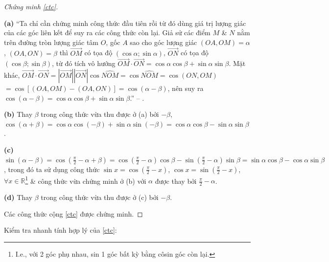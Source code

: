 \documentclass[oneside]{book}
\numberwithin{equation}{section}
\begin{document}
\begin{proof}[Chứng minh \eqref{ctc}]
	\begin{enumerate*}
		\item[\textbf{(a)}] ``Ta chỉ cần chứng minh công thức đầu tiên rồi từ đó dùng giá trị lượng giác của các góc liên kết để suy ra các công thức còn lại. Giả sử các điểm $M$ \& $N$ nằm trên đường tròn lượng giác tâm $O$, gốc $A$ sao cho góc lượng giác $(OA,OM) = \alpha$, $(OA,ON) = \beta$ thì $\overrightarrow{OM}$ có tọa độ $(\cos\alpha;\sin\alpha)$, $\overrightarrow{ON}$ có tọa độ $(\cos\beta;\sin\beta)$, từ đó tích vô hướng $\overrightarrow{OM}\cdot\overrightarrow{ON} = \cos\alpha\cos\beta + \sin\alpha\sin\beta$. Mặt khác, $\overrightarrow{OM}\cdot\overrightarrow{ON} = |\overrightarrow{OM}||\overrightarrow{ON}|\cos\widehat{NOM} = \cos\widehat{NOM} = \cos(ON,OM)$ $= \cos[(OA,OM) - (OA,ON)] = \cos(\alpha - \beta)$, nên suy ra $\cos(\alpha - \beta) = \cos\alpha\cos\beta + \sin\alpha\sin\beta$.'' -- \cite[pp. 5--6]{TL_chuyen_Toan_Dai_So_Giai_Tich_11}.
		\item[\textbf{(b)}] Thay $\beta$ trong công thức vừa thu được ở (a) bởi $-\beta$, $\cos(\alpha + \beta) = \cos\alpha\cos(-\beta) + \sin\alpha\sin(-\beta) = \cos\alpha\cos\beta - \sin\alpha\sin\beta$.
		\item[\textbf{(c)}] $\sin(\alpha - \beta) = \cos\left(\frac{\pi}{2} - \alpha + \beta\right) = \cos\left(\frac{\pi}{2} - \alpha\right)\cos\beta - \sin\left(\frac{\pi}{2} - \alpha\right)\sin\beta = \sin\alpha\cos\beta - \cos\alpha\sin\beta$, trong đó ta sử dụng công thức $\sin x = \cos\left(\frac{\pi}{2} - x\right)$, $\cos x = \sin\left(\frac{\pi}{2} - x\right)$, $\forall x\in\mathbb{R}$\footnote{I.e., với 2 góc phụ nhau, sin 1 góc bất kỳ bằng côsin góc còn lại.} \& công thức vừa chứng minh ở (b) với $\alpha$ được thay bởi $\frac{\pi}{2} - \alpha$.
		\item[\textbf{(d)}] Thay $\beta$ trong công thức vừa thu được ở (c) bởi $-\beta$.
	\end{enumerate*}
	Các công thức cộng \eqref{ctc} được chứng minh.
\end{proof}
Kiểm tra nhanh tính hợp lý của \eqref{ctc}:
\end{document}
